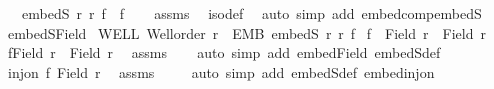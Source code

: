 \begin{isabellebody}
\ \ \ {\isachardoublequoteopen}embedS\ r\ r{\isacharprime}{\kern0pt}{\isacharprime}{\kern0pt}\ {\isacharparenleft}{\kern0pt}f{\isacharprime}{\kern0pt}\ {\isasymcirc}\ f{\isacharparenright}{\kern0pt}{\isachardoublequoteclose}\isanewline
%
\isadelimproof
\ \ %
\endisadelimproof
%
\isatagproof
{}\isamarkupfalse%
\ assms\ \isamarkupfalse%
\ iso{\isacharunderscore}{\kern0pt}def\ \isamarkupfalse%
\ {\isacharparenleft}{\kern0pt}auto\ simp\ add{\isacharcolon}{\kern0pt}\ embed{\isacharunderscore}{\kern0pt}comp{\isacharunderscore}{\kern0pt}embedS{\isacharparenright}{\kern0pt}%
\endisatagproof
{\isafoldproof}%
%
\isadelimproof
\isanewline
%
\endisadelimproof
\isanewline
{}\isamarkupfalse%
\ embedS{\isacharunderscore}{\kern0pt}Field{\isacharcolon}{\kern0pt}\isanewline
{}\ WELL{\isacharcolon}{\kern0pt}\ {\isachardoublequoteopen}Well{\isacharunderscore}{\kern0pt}order\ r{\isachardoublequoteclose}\ \ EMB{\isacharcolon}{\kern0pt}\ {\isachardoublequoteopen}embedS\ r\ r{\isacharprime}{\kern0pt}\ f{\isachardoublequoteclose}\isanewline
{}\ {\isachardoublequoteopen}f\ {\isacharbackquote}{\kern0pt}\ {\isacharparenleft}{\kern0pt}Field\ r{\isacharparenright}{\kern0pt}\ {\isacharless}{\kern0pt}\ Field\ r{\isacharprime}{\kern0pt}{\isachardoublequoteclose}\isanewline
%
\isadelimproof
%
\endisadelimproof
%
\isatagproof
{}\isamarkupfalse%
{\isacharminus}{\kern0pt}\isanewline
\ \ \isamarkupfalse%
\ {\isachardoublequoteopen}f{\isacharbackquote}{\kern0pt}{\isacharparenleft}{\kern0pt}Field\ r{\isacharparenright}{\kern0pt}\ {\isasymle}\ Field\ r{\isacharprime}{\kern0pt}{\isachardoublequoteclose}\ \isamarkupfalse%
\ assms\isanewline
\ \ \isamarkupfalse%
\ {\isacharparenleft}{\kern0pt}auto\ simp\ add{\isacharcolon}{\kern0pt}\ embed{\isacharunderscore}{\kern0pt}Field\ embedS{\isacharunderscore}{\kern0pt}def{\isacharparenright}{\kern0pt}\isanewline
\ \ \isamarkupfalse%
\isanewline
\ \ \isacommand{{\isacharbraceleft}{\kern0pt}}\isamarkupfalse%
\isamarkupfalse%
\ {\isachardoublequoteopen}inj{\isacharunderscore}{\kern0pt}on\ f\ {\isacharparenleft}{\kern0pt}Field\ r{\isacharparenright}{\kern0pt}{\isachardoublequoteclose}\ \isamarkupfalse%
\ assms\isanewline
\ \ \ \isamarkupfalse%
\ {\isacharparenleft}{\kern0pt}auto\ simp\ add{\isacharcolon}{\kern0pt}\ embedS{\isacharunderscore}{\kern0pt}def\ embed{\isacharunderscore}{\kern0pt}inj{\isacharunderscore}{\kern0pt}on{\isacharparenright}{\kern0pt}\isanewline

\end{isabellebody}
